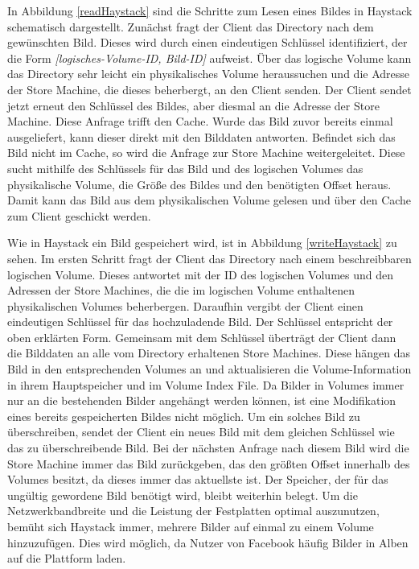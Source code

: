 \documentclass[12pt,oneside,a4paper,parskip]{scrbook}
\begin{document}
In Abbildung \ref{readHaystack} sind die Schritte zum Lesen eines Bildes in Haystack schematisch dargestellt. Zunächst fragt der Client das Directory nach dem gewünschten Bild. Dieses wird durch einen eindeutigen Schlüssel identifiziert, der die Form \textit{[logisches-Volume-ID, Bild-ID]} aufweist. Über das logische Volume kann das Directory sehr leicht ein physikalisches Volume heraussuchen und die Adresse der Store Machine, die dieses beherbergt, an den Client senden. Der Client sendet jetzt erneut den Schlüssel des Bildes, aber diesmal an die Adresse der Store Machine. Diese Anfrage trifft den Cache. Wurde das Bild zuvor bereits einmal ausgeliefert, kann dieser direkt mit den Bilddaten antworten. Befindet sich das Bild nicht im Cache, so wird die Anfrage zur Store Machine weitergeleitet. Diese sucht mithilfe des Schlüssels für das Bild und des logischen Volumes das physikalische Volume, die Größe des Bildes und den benötigten Offset heraus. Damit kann das Bild aus dem physikalischen Volume gelesen und über den Cache zum Client geschickt werden. 

Wie in Haystack ein Bild gespeichert wird, ist in Abbildung \ref{writeHaystack} zu sehen. Im ersten Schritt fragt der Client das Directory nach einem beschreibbaren logischen Volume. Dieses antwortet mit der ID des logischen Volumes und den Adressen der Store Machines, die die im logischen Volume enthaltenen physikalischen Volumes beherbergen. Daraufhin vergibt der Client einen eindeutigen Schlüssel für das hochzuladende Bild. Der Schlüssel entspricht der oben erklärten Form. Gemeinsam mit dem Schlüssel überträgt der Client dann die Bilddaten an alle vom Directory erhaltenen Store Machines. Diese hängen das Bild in den entsprechenden Volumes an und aktualisieren die Volume-Information in ihrem Hauptspeicher und im Volume Index File. Da Bilder in Volumes immer nur an die bestehenden Bilder angehängt werden können, ist eine Modifikation eines bereits gespeicherten Bildes nicht möglich. Um ein solches Bild zu überschreiben, sendet der Client ein neues Bild mit dem gleichen Schlüssel wie das zu überschreibende Bild. Bei der nächsten Anfrage nach diesem Bild wird die Store Machine immer das Bild zurückgeben, das den größten Offset innerhalb des Volumes besitzt, da dieses immer das aktuellste ist. Der Speicher, der für das ungültig gewordene Bild benötigt wird, bleibt weiterhin belegt. Um die Netzwerkbandbreite und die Leistung der Festplatten optimal auszunutzen, bemüht sich Haystack immer, mehrere Bilder auf einmal zu einem Volume hinzuzufügen. Dies wird möglich, da Nutzer von Facebook häufig Bilder in Alben auf die Plattform laden.
\end{document}
